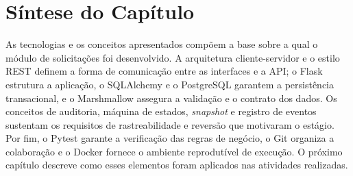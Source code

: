 \section{Síntese do Capítulo}
\label{sec:resumo-embasamento-teorico}
As tecnologias e os conceitos apresentados compõem a base sobre a qual o
módulo de solicitações foi desenvolvido. A arquitetura cliente-servidor e o
estilo REST definem a forma de comunicação entre as interfaces e a API; o Flask
estrutura a aplicação, o SQLAlchemy e o PostgreSQL garantem a persistência
transacional, e o Marshmallow assegura a validação e o contrato dos dados. Os
conceitos de auditoria, máquina de estados, \textit{snapshot} e registro de eventos
sustentam os requisitos de rastreabilidade e reversão que motivaram o estágio. Por
fim, o Pytest garante a verificação das regras de negócio, o Git organiza a
colaboração e o Docker fornece o ambiente reprodutível de execução. O próximo
capítulo descreve como esses elementos foram aplicados nas atividades realizadas.
